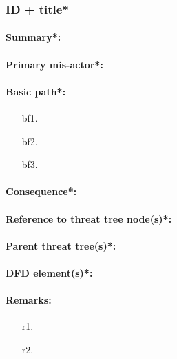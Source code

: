 \subsubsection{ID + title*}
\paragraph{Summary*:}
\paragraph{Primary mis-actor*:}
\paragraph{Basic path*:}
\begin{enumerate}
	\item[bf1.]{}
    \item[bf2.]{}
    \item[bf3.]{}
\end{enumerate}
\paragraph{Consequence*:}
\paragraph{Reference to threat tree node(s)*:}
\paragraph{Parent threat tree(s)*:}
\paragraph{DFD element(s)*:}
\paragraph{Remarks:}
	\begin{enumerate}
         \item[r1.]
         \item[r2.]
    \end{enumerate}
